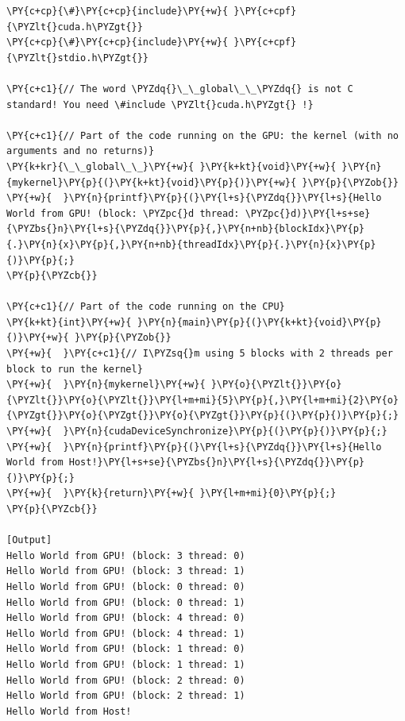 \begin{Verbatim}[label=\makebox{\url{https://github.com/lucabaldini/cmepda/tree/master/slides/latex/snippets/cuda_hello_world.cu}},commandchars=\\\{\}]
\PY{c+cp}{\#}\PY{c+cp}{include}\PY{+w}{ }\PY{c+cpf}{\PYZlt{}cuda.h\PYZgt{}}
\PY{c+cp}{\#}\PY{c+cp}{include}\PY{+w}{ }\PY{c+cpf}{\PYZlt{}stdio.h\PYZgt{}}

\PY{c+c1}{// The word \PYZdq{}\_\_global\_\_\PYZdq{} is not C standard! You need \#include \PYZlt{}cuda.h\PYZgt{} !}

\PY{c+c1}{// Part of the code running on the GPU: the kernel (with no arguments and no returns)}
\PY{k+kr}{\_\_global\_\_}\PY{+w}{ }\PY{k+kt}{void}\PY{+w}{ }\PY{n}{mykernel}\PY{p}{(}\PY{k+kt}{void}\PY{p}{)}\PY{+w}{ }\PY{p}{\PYZob{}}
\PY{+w}{  }\PY{n}{printf}\PY{p}{(}\PY{l+s}{\PYZdq{}}\PY{l+s}{Hello World from GPU! (block: \PYZpc{}d thread: \PYZpc{}d)}\PY{l+s+se}{\PYZbs{}n}\PY{l+s}{\PYZdq{}}\PY{p}{,}\PY{n+nb}{blockIdx}\PY{p}{.}\PY{n}{x}\PY{p}{,}\PY{n+nb}{threadIdx}\PY{p}{.}\PY{n}{x}\PY{p}{)}\PY{p}{;}
\PY{p}{\PYZcb{}}

\PY{c+c1}{// Part of the code running on the CPU}
\PY{k+kt}{int}\PY{+w}{ }\PY{n}{main}\PY{p}{(}\PY{k+kt}{void}\PY{p}{)}\PY{+w}{ }\PY{p}{\PYZob{}}
\PY{+w}{  }\PY{c+c1}{// I\PYZsq{}m using 5 blocks with 2 threads per block to run the kernel}
\PY{+w}{  }\PY{n}{mykernel}\PY{+w}{ }\PY{o}{\PYZlt{}}\PY{o}{\PYZlt{}}\PY{o}{\PYZlt{}}\PY{l+m+mi}{5}\PY{p}{,}\PY{l+m+mi}{2}\PY{o}{\PYZgt{}}\PY{o}{\PYZgt{}}\PY{o}{\PYZgt{}}\PY{p}{(}\PY{p}{)}\PY{p}{;}
\PY{+w}{  }\PY{n}{cudaDeviceSynchronize}\PY{p}{(}\PY{p}{)}\PY{p}{;}
\PY{+w}{  }\PY{n}{printf}\PY{p}{(}\PY{l+s}{\PYZdq{}}\PY{l+s}{Hello World from Host!}\PY{l+s+se}{\PYZbs{}n}\PY{l+s}{\PYZdq{}}\PY{p}{)}\PY{p}{;}
\PY{+w}{  }\PY{k}{return}\PY{+w}{ }\PY{l+m+mi}{0}\PY{p}{;}
\PY{p}{\PYZcb{}}

[Output]
Hello World from GPU! (block: 3 thread: 0)                                                                      
Hello World from GPU! (block: 3 thread: 1)
Hello World from GPU! (block: 0 thread: 0)
Hello World from GPU! (block: 0 thread: 1)
Hello World from GPU! (block: 4 thread: 0)
Hello World from GPU! (block: 4 thread: 1)
Hello World from GPU! (block: 1 thread: 0)
Hello World from GPU! (block: 1 thread: 1)
Hello World from GPU! (block: 2 thread: 0)
Hello World from GPU! (block: 2 thread: 1)
Hello World from Host!
\end{Verbatim}